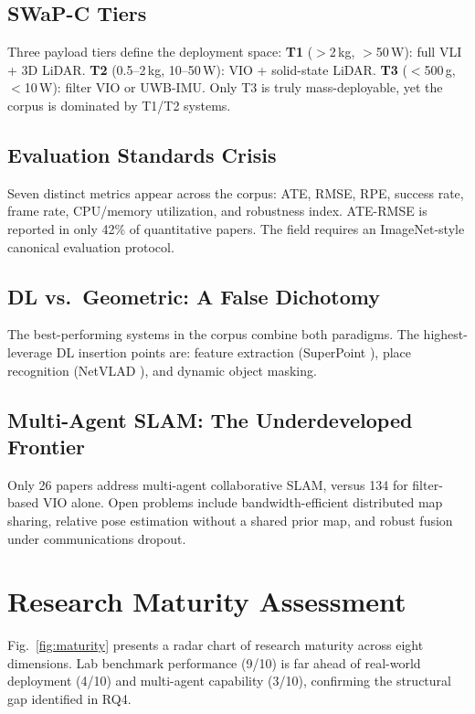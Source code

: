 \documentclass[journal]{IEEEtran}
\begin{document}
\subsection{SWaP-C Tiers}
Three payload tiers define the deployment space:
\textbf{T1} ($>$2\,kg, $>$50\,W): full VLI + 3D LiDAR.
\textbf{T2} (0.5--2\,kg, 10--50\,W): VIO + solid-state LiDAR.
\textbf{T3} ($<$500\,g, $<$10\,W): filter VIO or UWB-IMU. Only T3 is
truly mass-deployable, yet the corpus is dominated by T1/T2 systems.

\subsection{Evaluation Standards Crisis}
Seven distinct metrics appear across the corpus: ATE, RMSE, RPE, success
rate, frame rate, CPU/memory utilization, and robustness index. ATE-RMSE
is reported in only 42\% of quantitative papers. The field requires an
ImageNet-style canonical evaluation protocol.

\subsection{DL vs.\ Geometric: A False Dichotomy}
The best-performing systems in the corpus combine both paradigms. The
highest-leverage DL insertion points are: feature extraction (SuperPoint
\cite{DeTone2018}), place recognition (NetVLAD \cite{Arandjelovic2016}),
and dynamic object masking.

\subsection{Multi-Agent SLAM: The Underdeveloped Frontier}
Only 26 papers address multi-agent collaborative SLAM, versus 134 for
filter-based VIO alone. Open problems include bandwidth-efficient
distributed map sharing, relative pose estimation without a shared prior
map, and robust fusion under communications dropout.

\section{Research Maturity Assessment}
\label{sec:maturity}

Fig.~\ref{fig:maturity} presents a radar chart of research maturity across
eight dimensions. Lab benchmark performance (9/10) is far ahead of
real-world deployment (4/10) and multi-agent capability (3/10), confirming
the structural gap identified in RQ4.
\end{document}
